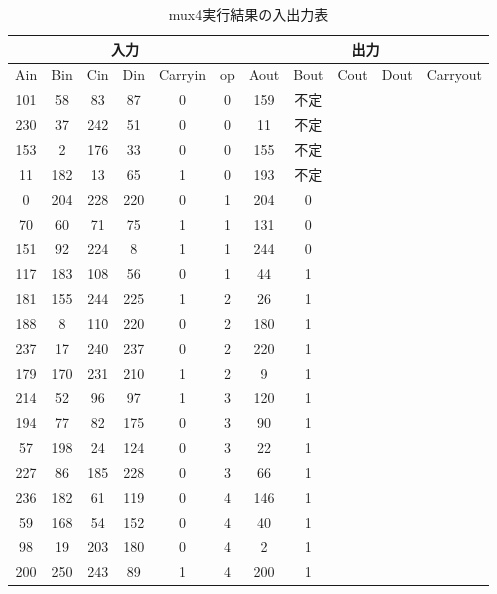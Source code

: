\documentclass[12pt]{jreport}
\begin{document}
            \begin{table}[htb]
              \begin{center}
                \caption{mux4実行結果の入出力表}
                \begin{tabular} {|c|c|c|c|c|c|c|c|c|c|c|} \hline
                  \multicolumn{6}{|c|}{入力} & \multicolumn{5}{|c|}{出力} \\ \hline \hline
                        Ain & Bin & Cin & Din & Carryin & op & Aout & Bout & Cout & Dout & Carryout \\ \hline
                        101 & 58 & 83 & 87 & 0 & 0 & 159 & 不定\\ \hline
                        230 & 37 & 242 & 51 & 0 & 0 & 11 & 不定 \\ \hline
                        153 & 2 & 176 & 33 & 0 & 0 & 155 & 不定 \\ \hline
                        11 & 182 & 13 & 65 & 1 & 0 & 193 & 不定 \\ \hline

                        0 & 204 & 228 & 220 & 0 & 1 & 204 & 0 \\ \hline
                        70 & 60 & 71 & 75 & 1 & 1 & 131 & 0 \\ \hline
                        151 & 92 & 224 & 8 & 1 & 1 & 244 & 0 \\ \hline
                        117 & 183 & 108 & 56 & 0 & 1 & 44 & 1 \\ \hline

                        181 & 155 & 244 & 225 & 1 & 2 & 26 & 1 \\ \hline
                        188 & 8 & 110 & 220 & 0 & 2 & 180 & 1 \\ \hline
                        237 & 17 & 240 & 237 & 0 & 2 & 220 & 1 \\ \hline
                        179 & 170 & 231 & 210 & 1 & 2 & 9 & 1 \\ \hline

                        214 & 52 & 96 & 97 & 1 & 3 & 120 & 1 \\ \hline
                        194 & 77 & 82 & 175 & 0 & 3 & 90 & 1 \\ \hline
                        57 & 198 & 24 & 124 & 0 & 3 & 22 & 1 \\ \hline
                        227 & 86 & 185 & 228 & 0 & 3 & 66 & 1 \\ \hline

                        236 & 182 & 61 & 119 & 0 & 4 & 146 & 1 \\ \hline
                        59 & 168 & 54 & 152 & 0 & 4 & 40 & 1 \\ \hline
                        98 & 19 & 203 & 180 & 0 & 4 & 2 & 1 \\ \hline
                        200 & 250 & 243 & 89 & 1 & 4 & 200 & 1 \\ \hline


\end{tabular}
\end{center}
\end{table}
\end{document}
